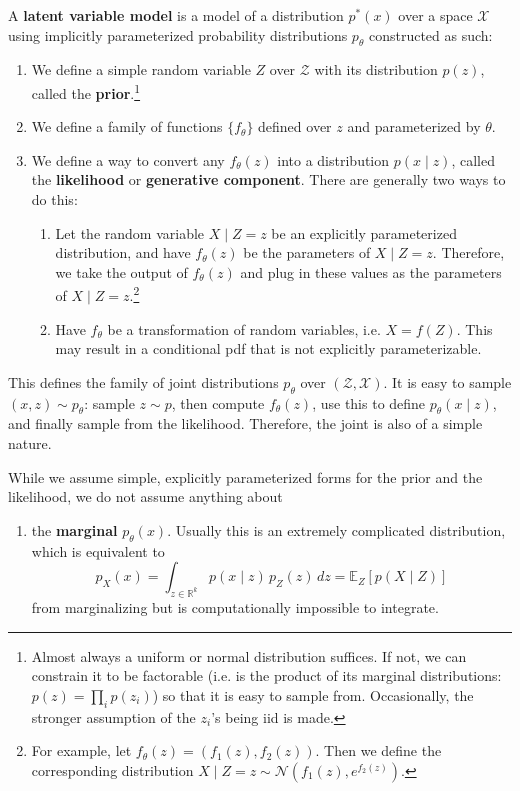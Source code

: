 \documentclass{article}
\begin{document}
  \begin{definition}
    A \textbf{latent variable model} is a model of a distribution $p^\ast (x)$ over a space $\mathcal{X}$ using implicitly parameterized probability distributions $p_\theta$ constructed as such: 
    \begin{enumerate}
      \item We define a simple random variable $Z$ over $\mathcal{Z}$ with its distribution $p(z)$, called the \textbf{prior}.\footnote{Almost always a uniform or normal distribution suffices. If not, we can constrain it to be factorable (i.e. is the product of its marginal distributions: $p(z) = \prod_i p(z_i)$) so that it is easy to sample from. Occasionally, the stronger assumption of the $z_i$'s being iid is made. } 
      \item We define a family of functions $\{f_\theta\}$ defined over $z$ and parameterized by $\theta$. 
      \item We define a way to convert any $f_\theta(z)$ into a distribution $p(x \mid z)$, called the \textbf{likelihood} or \textbf{generative component}. There are generally two ways to do this: 
      \begin{enumerate}
        \item Let the random variable $X \mid Z = z$ be an explicitly parameterized distribution, and have $f_\theta (z)$ be the parameters of $X \mid Z = z$. Therefore, we take the output of $f_\theta (z)$ and plug in these values as the parameters of $X \mid Z = z$.\footnote{For example, let $f_\theta (z) = (f_1 (z), f_2(z))$. Then we define the corresponding distribution $X \mid Z = z \sim \mathcal{N}(f_1 (z), e^{f_2 (z)} )$.}
        \item Have $f_\theta$ be a transformation of random variables, i.e. $X = f(Z)$. This may result in a conditional pdf that is not explicitly parameterizable.
      \end{enumerate}
    \end{enumerate}
    This defines the family of joint distributions $p_\theta$ over $(\mathcal{Z}, \mathcal{X})$. It is easy to sample $(x, z) \sim p_\theta$: sample $z \sim p$, then compute $f_\theta (z)$, use this to define $p_\theta (x \mid z)$, and finally sample from the likelihood. Therefore, the joint is also of a simple nature. 

    While we assume simple, explicitly parameterized forms for the prior and the likelihood, we do not assume anything about 
    \begin{enumerate}
      \item the \textbf{marginal} $p_\theta (x)$. Usually this is an extremely complicated distribution, which is equivalent to 
      \begin{equation} 
        p_X (x) = \int_{z \in \mathbb{R}^k} p (x \mid z) \, p_Z (z) \,dz = \mathbb{E}_Z [p(X \mid Z)] 
      \end{equation} 
      from marginalizing but is computationally impossible to integrate. 


\end{enumerate}
\end{definition}
\end{document}
